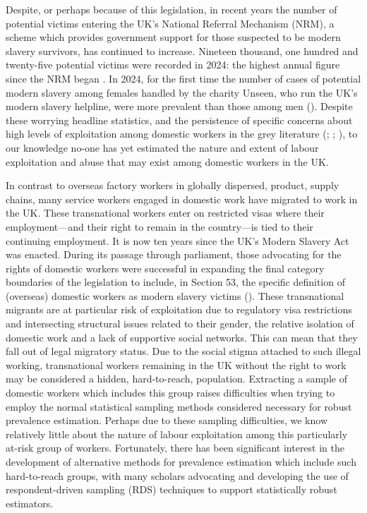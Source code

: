 \documentclass[
  12pt,
  letterpaper,
  DIV=11,
  numbers=noendperiod]{scrartcl}
\theoremstyle{plain}
\theoremstyle{definition}
\begin{document}
Despite, or perhaps because of this legislation, in recent years the
number of potential victims entering the UK's National Referral
Mechanism (NRM), a scheme which provides government support for those
suspected to be modern slavery survivors, has continued to increase.
Nineteen thousand, one hundred and twenty-five potential victims were
recorded in 2024: the highest annual figure since the NRM began
\autocite{home_office_modern_2025}. In 2024, for the first time the
number of cases of potential modern slavery among females handled by the
charity Unseen, who run the UK's modern slavery helpline, were more
prevalent than those among men (\textcite{carter_women_2025}). Despite
these worrying headline statistics, and the persistence of specific
concerns about high levels of exploitation among domestic workers in the
grey literature (\textcite{kalayaan_new_2008};
\textcite{mantouvalou_modern_2016};
\textcite{latin_american_womens_rights_service_behind_2023}), to our
knowledge no-one has yet estimated the nature and extent of labour
exploitation and abuse that may exist among domestic workers in the UK.

In contrast to overseas factory workers in globally dispersed, product,
supply chains, many service workers engaged in domestic work have
migrated to work in the UK. These transnational workers enter on
restricted visas where their employment---and their right to remain in
the country---is tied to their continuing employment. It is now ten
years since the UK's Modern Slavery Act was enacted. During its passage
through parliament, those advocating for the rights of domestic workers
were successful in expanding the final category boundaries of the
legislation to include, in Section 53, the specific definition of
(overseas) domestic workers as modern slavery victims
(\textcite{caruana_boundaries_2025}). These transnational migrants are
at particular risk of exploitation due to regulatory visa restrictions
and intersecting structural issues related to their gender, the relative
isolation of domestic work and a lack of supportive social networks.
This can mean that they fall out of legal migratory status. Due to the
social stigma attached to such illegal working, transnational workers
remaining in the UK without the right to work may be considered a
hidden, hard-to-reach, population. Extracting a sample of domestic
workers which includes this group raises difficulties when trying to
employ the normal statistical sampling methods considered necessary for
robust prevalence estimation. Perhaps due to these sampling
difficulties, we know relatively little about the nature of labour
exploitation among this particularly at-risk group of workers.
Fortunately, there has been significant interest in the development of
alternative methods for prevalence estimation which include such
hard-to-reach groups, with many scholars advocating and developing the
use of respondent-driven sampling (RDS) techniques to support
statistically robust estimators.
\end{document}
